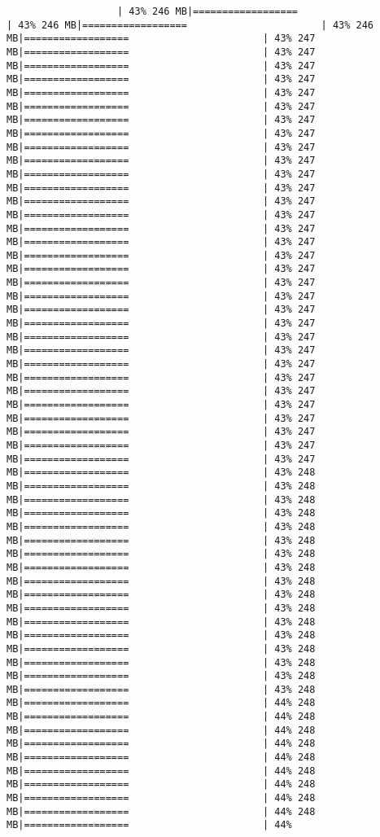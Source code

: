 \documentclass[
]{article}
\begin{document}
\begin{verbatim}
                   | 43% 246 MB|==================                       | 43% 246 MB|==================                       | 43% 246 MB|==================                       | 43% 247 MB|==================                       | 43% 247 MB|==================                       | 43% 247 MB|==================                       | 43% 247 MB|==================                       | 43% 247 MB|==================                       | 43% 247 MB|==================                       | 43% 247 MB|==================                       | 43% 247 MB|==================                       | 43% 247 MB|==================                       | 43% 247 MB|==================                       | 43% 247 MB|==================                       | 43% 247 MB|==================                       | 43% 247 MB|==================                       | 43% 247 MB|==================                       | 43% 247 MB|==================                       | 43% 247 MB|==================                       | 43% 247 MB|==================                       | 43% 247 MB|==================                       | 43% 247 MB|==================                       | 43% 247 MB|==================                       | 43% 247 MB|==================                       | 43% 247 MB|==================                       | 43% 247 MB|==================                       | 43% 247 MB|==================                       | 43% 247 MB|==================                       | 43% 247 MB|==================                       | 43% 247 MB|==================                       | 43% 247 MB|==================                       | 43% 247 MB|==================                       | 43% 247 MB|==================                       | 43% 247 MB|==================                       | 43% 247 MB|==================                       | 43% 248 MB|==================                       | 43% 248 MB|==================                       | 43% 248 MB|==================                       | 43% 248 MB|==================                       | 43% 248 MB|==================                       | 43% 248 MB|==================                       | 43% 248 MB|==================                       | 43% 248 MB|==================                       | 43% 248 MB|==================                       | 43% 248 MB|==================                       | 43% 248 MB|==================                       | 43% 248 MB|==================                       | 43% 248 MB|==================                       | 43% 248 MB|==================                       | 43% 248 MB|==================                       | 43% 248 MB|==================                       | 43% 248 MB|==================                       | 44% 248 MB|==================                       | 44% 248 MB|==================                       | 44% 248 MB|==================                       | 44% 248 MB|==================                       | 44% 248 MB|==================                       | 44% 248 MB|==================                       | 44% 248 MB|==================                       | 44% 248 MB|==================                       | 44% 248 MB|==================                       | 44% 
\end{verbatim}
\end{document}
